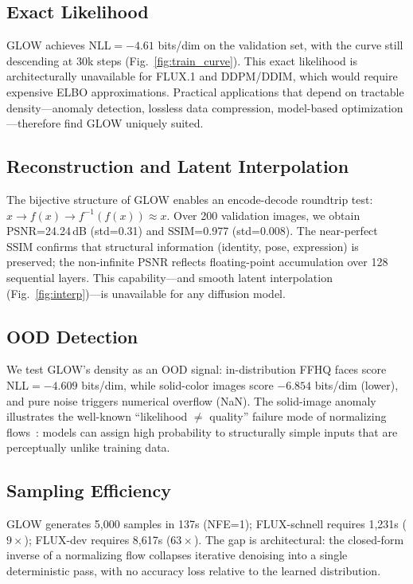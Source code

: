 \documentclass[10pt,twocolumn]{article}
\begin{document}
\subsection{Exact Likelihood}
GLOW achieves NLL$=-4.61$ bits/dim on the validation set, with the curve still descending at 30k steps (Fig.~\ref{fig:train_curve}). This exact likelihood is architecturally unavailable for FLUX.1 and DDPM/DDIM, which would require expensive ELBO approximations. Practical applications that depend on tractable density---anomaly detection, lossless data compression, model-based optimization---therefore find GLOW uniquely suited.

\subsection{Reconstruction and Latent Interpolation}
The bijective structure of GLOW enables an encode-decode roundtrip test: $x \to f(x) \to f^{-1}(f(x)) \approx x$. Over 200 validation images, we obtain PSNR=24.24\,dB (std=0.31) and SSIM=0.977 (std=0.008). The near-perfect SSIM confirms that structural information (identity, pose, expression) is preserved; the non-infinite PSNR reflects floating-point accumulation over 128 sequential layers. This capability---and smooth latent interpolation (Fig.~\ref{fig:interp})---is unavailable for any diffusion model.

\subsection{OOD Detection}
We test GLOW's density as an OOD signal: in-distribution FFHQ faces score NLL$=-4.609$ bits/dim, while solid-color images score $-6.854$ bits/dim (lower), and pure noise triggers numerical overflow (NaN). The solid-image anomaly illustrates the well-known ``likelihood $\neq$ quality'' failure mode of normalizing flows~\cite{nalisnick2019deep}: models can assign high probability to structurally simple inputs that are perceptually unlike training data.

\subsection{Sampling Efficiency}
GLOW generates 5,000 samples in 137s (NFE=1); FLUX-schnell requires 1,231s ($9\times$); FLUX-dev requires 8,617s ($63\times$). The gap is architectural: the closed-form inverse of a normalizing flow collapses iterative denoising into a single deterministic pass, with no accuracy loss relative to the learned distribution.
\end{document}
